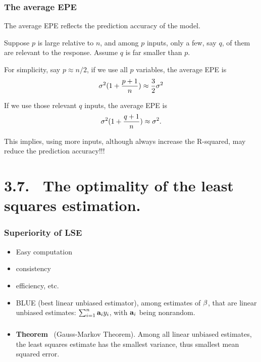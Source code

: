 \documentclass{beamer}
\def\bfa{{\bf a}}
\begin{document}
       \begin{frame} 
       	\frametitle{The average EPE }
       	The average EPE reflects the prediction accuracy of the model. 
       	
       	Suppose $p$ is large relative to $n$, and among $p$ inputs, only a few, say $q$, of them are
       	relevant to the response. Assume $q$ is far smaller than $p$. 
       	
       	For simplicity, say $p \approx n/2$, if we use all $p$ variables, the average EPE is
       	$$ \sigma^2 ( 1 + {p+1  \over n} )  \approx {3 \over 2} \sigma^2$$
       	
       	If we use those relevant $q$ inputs, the 
       	average EPE is
       	$$ \sigma^2 ( 1 + {q+1  \over n} )  \approx  \sigma^2.$$
       	
       	This implies,  using more inputs, although always increase the R-squared, may reduce the 
       	prediction accuracy!!!
       	
       	\end{frame}
       	 
       	
      
      
      \section{3.7. \ The optimality of the least squares estimation.}
      
      \begin{frame}
      	\frametitle{Superiority of LSE}
      	
      	\begin{itemize}
      		\item Easy computation 
      		\item consistency 
      		\item
      		efficiency, etc.
      		\item BLUE (best linear unbiased estimator), among 	
      		estimates of ${\bf \beta}$,  that are linear unbiased estimates: $\sum_{i=1}^n \bfa_i y_i$, with
      		$\bfa_i$ being nonrandom. 
      		
      	\end{itemize}
      \end{frame}
      
      
      
      
      \begin{frame}
      	\frametitle{  }
      	\begin{itemize}
      		\item	
      		{\bf Theorem} \ (Gauss-Markov Theorem). Among all linear unbiased estimates, the least squares estimate
      		has the smallest variance, thus smallest mean squared error.	 
      		
      	\end{itemize}
      \end{frame}
      
\end{document}
